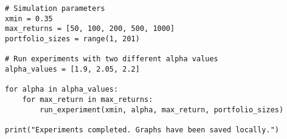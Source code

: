 \documentclass[a4paper, oneside]{discothesis}
\begin{document}
\begin{verbatim}
# Simulation parameters
xmin = 0.35
max_returns = [50, 100, 200, 500, 1000]
portfolio_sizes = range(1, 201)

# Run experiments with two different alpha values
alpha_values = [1.9, 2.05, 2.2]

for alpha in alpha_values:
    for max_return in max_returns:
        run_experiment(xmin, alpha, max_return, portfolio_sizes)

print("Experiments completed. Graphs have been saved locally.")
    
\end{verbatim}
\end{document}
